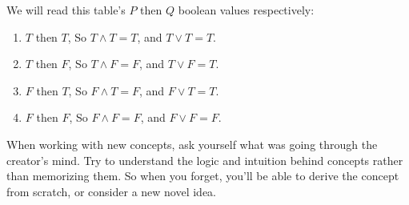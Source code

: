 We will read this table's $P$ then $Q$ boolean values respectively:
\begin{enumerate}
    \item $T$ then $T$, So $T\land T = T$, and $T\lor T = T$.
    \item $T$ then $F$, So $T\land F = F$, and $T\lor F = T$.
    \item $F$ then $T$, So $F\land T = F$, and $F\lor T = T$.
    \item $F$ then $F$, So $F\land F = F$, and $F\lor F = F$.
\end{enumerate}

\begin{Tip}
    When working with new concepts, ask yourself what was going through the creator's mind.
    Try to understand the logic and intuition behind concepts rather than memorizing them.
    So when you forget, you'll be able to derive the concept from scratch, or consider a new novel idea.\\
\end{Tip}
